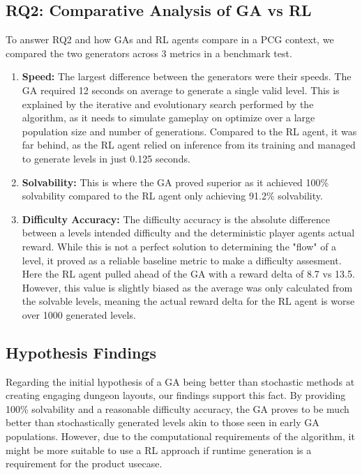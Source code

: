 \subsection{RQ2: Comparative Analysis of GA vs RL}
To answer RQ2 and how GAs and RL agents compare in a PCG context, we compared the two generators across 3 metrics in a benchmark test.
\begin{enumerate}
  \item \textbf{Speed:} The largest difference between the generators were their speeds. The GA required 12 seconds on average to generate a single valid level. 
  This is explained by the iterative and evolutionary search performed by the algorithm, as it needs to simulate gameplay on optimize over a large population size
  and number of generations.
  Compared to the RL agent, it was far behind, as the RL agent relied on inference from its training and managed to generate levels in just 0.125 seconds. 
  \item \textbf{Solvability:} This is where the GA proved superior as it achieved 100\% solvability compared to the RL agent only achieving 91.2\% solvability.
  \item \textbf{Difficulty Accuracy:} The difficulty accuracy is the absolute difference between a levels intended difficulty and the deterministic player 
  agents actual reward. While this is not a perfect solution to determining the "flow" of a level, it proved as a reliable baseline metric to make a difficulty assesment.
  Here the RL agent pulled ahead of the GA with a reward delta of 8.7 vs 13.5. However, this value is slightly biased as the average was only calculated from
  the solvable levels, meaning the actual reward delta for the RL agent is worse over 1000 generated levels. 
\end{enumerate}

\subsection{Hypothesis Findings}
Regarding the initial hypothesis of a GA being better than stochastic methods at creating engaging dungeon layouts, our findings support this fact.
By providing 100\% solvability and a reasonable difficulty accuracy, the GA proves to be much better than stochastically generated levels akin to those
seen in early GA populations. However, due to the computational requirements of the algorithm, it might be more suitable to use a RL approach if runtime
generation is a requirement for the product usecase.

